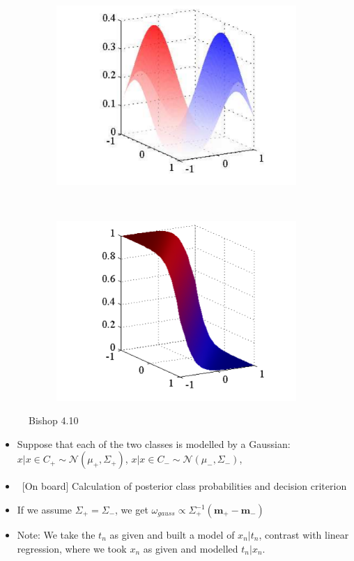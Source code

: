 \begin{figure}
	\centering
	\begin{subfigure}[b]{0.45\textwidth}
		\includegraphics[width=\textwidth]{./lecture6/Figure410a.pdf}
	\end{subfigure}
	~
	\begin{subfigure}[b]{0.45\textwidth}
		\includegraphics[width=\textwidth]{./lecture6/Figure410b.pdf}
	\end{subfigure}
	\caption{Bishop 4.10}
\end{figure}


\begin{itemize}
	\item Suppose that each of the two classes is modelled by a Gaussian: $x | x \in C_+ \sim \mathcal{N}\left(\mu_+, \Sigma_+\right)$, $x | x \in C_- \sim \mathcal{N}\left(\mu_-, \Sigma_-\right)$, 
	\item ~[On board] Calculation of posterior class probabilities and decision criterion
	\item  If we assume $\Sigma_+=\Sigma_-$, we get $\omega_{gauss} \propto \Sigma_+^{-1} (\mathbf{m}_+-\mathbf{m}_-)$
	\item Note: We take the $t_n$ as given and built a model of $x_n | t_n$, contrast with linear regression, where we took $x_n$ as given and modelled $t_n |x_n$.
\end{itemize}

